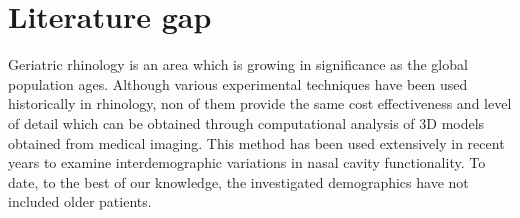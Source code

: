 \section{Literature gap}

Geriatric rhinology is an area which is growing in significance as the global population ages. Although various experimental techniques have been used historically in rhinology, non of them provide the same cost effectiveness and level of detail which can be obtained through computational analysis of 3D models obtained from medical imaging. This method has been used extensively in recent years to examine interdemographic variations in nasal cavity functionality. To date, to the best of our knowledge, the investigated demographics have not included older patients.
